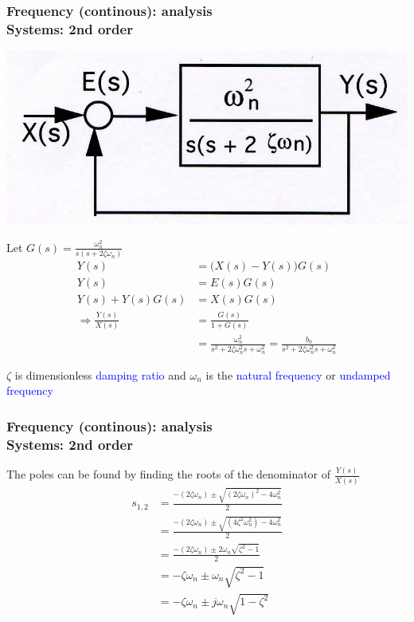\documentclass[hyperref={pdfpagelabels=true}]{beamer}
\begin{document}
\begin{frame}
\frametitle{Frequency (continous): analysis \\ {\large Systems: 2nd order}}
\centering
\includegraphics[scale = 0.3]{figs/Selection_027.jpg} \\
\tiny{
Let $G(s)=\frac{\omega_n^2}{s(s+2\zeta\omega_n)}$
\begin{align*}
Y(s) &= \Bigg  (X(s)-Y(s) \Bigg )G(s) \\
Y(s) &=   E(s)G(s) \\
Y(s)+Y(s)G(s) &=X(s)G(s) \\
\Rightarrow \frac{Y(s)}{X(s)}&=\frac{G(s)}{1+G(s)} \\
&=\frac{\omega_n^2}{s^2+2\zeta \omega_n^2s+\omega_n^2} =\frac{b_0}{s^2+2\zeta \omega_n^2s+\omega_n^2}
\end{align*}

$\zeta$ is dimensionless \textcolor{blue}{damping ratio} and $\omega_n$ is the \textcolor{blue}{natural frequency} or
\textcolor{blue}{undamped frequency}
}
\end{frame}

\begin{frame}
\frametitle{Frequency (continous): analysis \\ {\large Systems: 2nd order}}
The poles can be found by finding the roots of the denominator of
$\frac{Y(s)}{X(s)}$
\begin{align*}
s_{1,2}&=\frac{-(2\zeta \omega_n)\pm \sqrt{(2\zeta\omega_n)^2-4\omega_n^2}}{2} \\
&=\frac{-(2\zeta \omega_n)\pm \sqrt{(4\zeta^2\omega_n^2)-4\omega_n^2}}{2} \\
&=\frac{-(2\zeta \omega_n)\pm 2\omega_n\sqrt{\zeta^2-1}}{2} \\
&=-\zeta \omega_n \pm \omega_n\sqrt{\zeta^2-1} \\
&=-\zeta \omega_n \pm j \omega_n\sqrt{1-\zeta^2}
\end{align*}
\end{frame}
\end{document}
